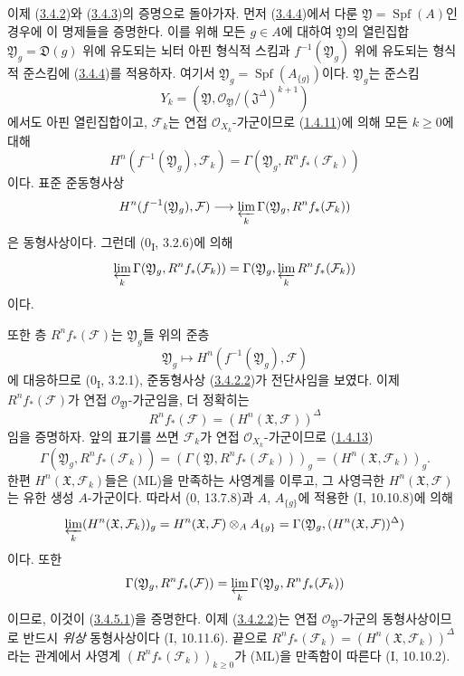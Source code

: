 \begin{env}[3.4.5]
\label{III.3.4.5-fr}
이제 (\hyperref[III.3.4.2-fr]{3.4.2})와
(\hyperref[III.3.4.3-fr]{3.4.3})의 증명으로 돌아가자. 먼저
(\hyperref[III.3.4.4-fr]{3.4.4})에서 다룬
$\mathfrak Y=\operatorname{Spf}(A)$인 경우에 이 명제들을 증명한다.
이를 위해 모든 $g\in A$에 대하여 $\mathfrak Y$의 열린집합
$\mathfrak Y_g=\mathfrak D(g)$ 위에 유도되는 뇌터 아핀 형식적 스킴과
$f^{-1}(\mathfrak Y_g)$ 위에 유도되는 형식적 준스킴에
(\hyperref[III.3.4.4-fr]{3.4.4})를 적용하자. 여기서
$\mathfrak Y_g=\operatorname{Spf}(A_{\{g\}})$이다. $\mathfrak Y_g$는
준스킴
\[
Y_k=(\mathfrak Y,\mathcal O_{\mathfrak Y}/
(\mathfrak J^\Delta)^{k+1})
\]
에서도 아핀 열린집합이고, $\mathcal F_k$는 연접
$\mathcal O_{X_k}$-가군이므로
(\hyperref[III.1.4.11-fr]{1.4.11})에 의해 모든 $k\geq0$에 대해
\[
H^n(f^{-1}(\mathfrak Y_g),\mathcal F_k)
=\Gamma(\mathfrak Y_g,R^nf_*(\mathcal F_k))
\]
이다. 표준 준동형사상
\[
H^n(f^{-1}(\mathfrak Y_g),\mathcal F)
\longrightarrow\varprojlim_k\Gamma(\mathfrak Y_g,R^nf_*(\mathcal F_k))
\]
은 동형사상이다. 그런데 (0\textsubscript{I}, 3.2.6)에 의해
\[
\varprojlim_k\Gamma(\mathfrak Y_g,R^nf_*(\mathcal F_k))
=\Gamma(\mathfrak Y_g,\varprojlim_kR^nf_*(\mathcal F_k))
\]
이다.

또한 층 $R^nf_*(\mathcal F)$는 $\mathfrak Y_g$들 위의 준층
\[
\mathfrak Y_g\longmapsto
H^n(f^{-1}(\mathfrak Y_g),\mathcal F)
\]
에 대응하므로 (0\textsubscript{I}, 3.2.1), 준동형사상
(\hyperref[III.3.4.2.2-fr]{3.4.2.2})가 전단사임을 보였다. 이제
$R^nf_*(\mathcal F)$가 연접 $\mathcal O_{\mathfrak Y}$-가군임을,
더 정확히는
\[
R^nf_*(\mathcal F)=(H^n(\mathfrak X,\mathcal F))^\Delta
\tag{3.4.5.1}\label{III.3.4.5.1-fr}
\]
임을 증명하자. 앞의 표기를 쓰면 $\mathcal F_k$가 연접
$\mathcal O_{X_k}$-가군이므로
(\hyperref[III.1.4.13-fr]{1.4.13})
\[
\Gamma(\mathfrak Y_g,R^nf_*(\mathcal F_k))
=(\Gamma(\mathfrak Y,R^nf_*(\mathcal F_k)))_g
=(H^n(\mathfrak X,\mathcal F_k))_g.
\]
한편 $H^n(\mathfrak X,\mathcal F_k)$들은 (ML)을 만족하는 사영계를
이루고, 그 사영극한 $H^n(\mathfrak X,\mathcal F)$는 유한 생성
$A$-가군이다. 따라서 (0, 13.7.8)과 $A$, $A_{\{g\}}$에 적용한
(I, 10.10.8)에 의해
\[
\varprojlim_k(H^n(\mathfrak X,\mathcal F_k))_g
=H^n(\mathfrak X,\mathcal F)\otimes_AA_{\{g\}}
=\Gamma(\mathfrak Y_g,(H^n(\mathfrak X,\mathcal F))^\Delta)
\]
이다. 또한
\[
\Gamma(\mathfrak Y_g,R^nf_*(\mathcal F))
=\varprojlim_k\Gamma(\mathfrak Y_g,R^nf_*(\mathcal F_k))
\]
이므로, 이것이 (\hyperref[III.3.4.5.1-fr]{3.4.5.1})을 증명한다.
이제 (\hyperref[III.3.4.2.2-fr]{3.4.2.2})는 연접
$\mathcal O_{\mathfrak Y}$-가군의 동형사상이므로 반드시 \emph{위상}
동형사상이다 (I, 10.11.6). 끝으로
$R^nf_*(\mathcal F_k)=(H^n(\mathfrak X,\mathcal F_k))^\Delta$라는
관계에서 사영계 $(R^nf_*(\mathcal F_k))_{k\geq0}$가 (ML)을 만족함이
따른다 (I, 10.10.2).


\end{env}
